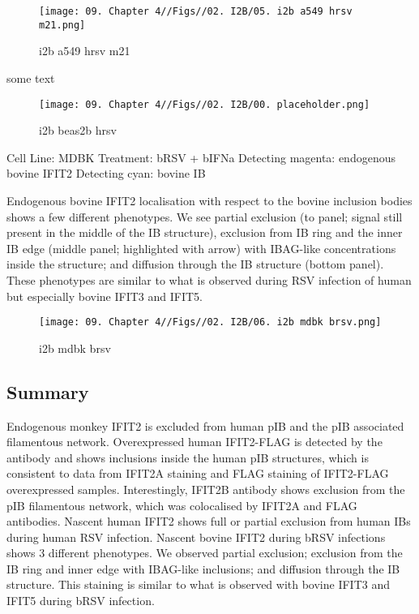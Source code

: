 \begin{figure}
    \centering
    \texttt{[image: 09. Chapter 4//Figs//02. I2B/05. i2b a549 hrsv m21.png]}
    \caption[i2b a549 hrsv m21]{i2b a549 hrsv m21}
    \label{i2b a549 hrsv m21}
\end{figure}

some text

\begin{figure}
    \centering
    \texttt{[image: 09. Chapter 4//Figs//02. I2B/00. placeholder.png]}
    \caption[i2b beas2b hrsv]{i2b beas2b hrsv}
    \label{i2b beas2b hrsv}
\end{figure}

Cell Line: MDBK \newline
Treatment: bRSV + bIFNa \newline
Detecting magenta: endogenous bovine IFIT2  \newline
Detecting cyan: bovine IB \newline

Endogenous bovine IFIT2 localisation with respect to the bovine inclusion bodies shows a few different phenotypes. We see partial exclusion (to panel; signal still present in the middle of the IB structure), exclusion from IB ring and the inner IB edge (middle panel; highlighted with arrow) with IBAG-like concentrations inside the structure; and diffusion through the IB structure (bottom panel). These phenotypes are similar to what is observed during RSV infection of human but especially bovine IFIT3 and IFIT5.

\begin{figure}
    \centering
    \texttt{[image: 09. Chapter 4//Figs//02. I2B/06. i2b mdbk brsv.png]}
    \caption[i2b mdbk brsv]{i2b mdbk brsv}
    \label{i2b mdbk brsv}
\end{figure}

\subsection{Summary} \label{Summary-i2b}
Endogenous monkey IFIT2 is excluded from human pIB and the pIB associated filamentous network. Overexpressed human IFIT2-FLAG is detected by the antibody and shows inclusions inside the human pIB structures, which is consistent to data from IFIT2A staining and FLAG staining of IFIT2-FLAG overexpressed samples. Interestingly, IFIT2B antibody shows exclusion from the pIB filamentous network, which was colocalised by IFIT2A and FLAG antibodies. Nascent human IFIT2 shows full or partial exclusion from human IBs during human RSV infection. Nascent bovine IFIT2 during bRSV infections shows 3 different phenotypes. We observed partial exclusion; exclusion from the IB ring and inner edge with IBAG-like inclusions; and diffusion through the IB structure. This staining is similar to what is observed with bovine IFIT3 and IFIT5 during bRSV infection.